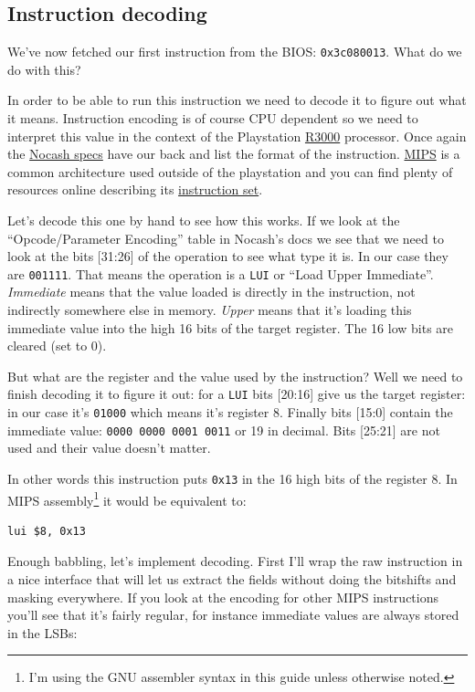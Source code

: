 \documentclass[a4paper]{article}
\newcommand{\code}[1] {\texttt{#1}}
\begin{document}
\subsection{Instruction decoding}

We've now fetched our first instruction from the BIOS:
\code{0x3c080013}. What do we do with this?

In order to be able to run this instruction we need to decode it to
figure out what it means. Instruction encoding is of course CPU
dependent so we need to interpret this value in the context of the
Playstation \href{https://en.wikipedia.org/wiki/R3000}{R3000}
processor. Once again the
\href{http://problemkaputt.de/psx-spx.htm#cpuspecifications}{Nocash
  specs} have our back and list the format of the
instruction. \href{https://en.wikipedia.org/wiki/MIPS_instruction_set}{MIPS}
is a common architecture used outside of the playstation and you can
find plenty of resources online describing its \href{https://en.wikipedia.org/wiki/Instruction_set}{instruction set}.

Let's decode this one by hand to see how this works. If we look at the
``Opcode/Parameter Encoding'' table in Nocash's docs we see that we
need to look at the bits [31:26] of the operation to see what type it
is. In our case they are \code{001111}. That means the operation is
a \code{LUI} or ``Load Upper Immediate''. \emph{Immediate} means
that the value loaded is directly in the instruction, not indirectly
somewhere else in memory. \emph{Upper} means that it's loading this
immediate value into the high 16 bits of the target register. The 16
low bits are cleared (set to 0).

But what are the register and the value used by the instruction? Well
we need to finish decoding it to figure it out: for a \code{LUI}
bits [20:16] give us the target register: in our case it's
\code{01000} which means it's register 8. Finally bits [15:0]
contain the immediate value: \code{0000 0000 0001 0011} or 19 in
decimal. Bits [25:21] are not used and their value doesn't matter.

In other words this instruction puts \code{0x13} in the 16 high bits
of the register 8. In MIPS assembly\footnote{I'm using the GNU
  assembler syntax in this guide unless otherwise noted.} it would be
equivalent to:

\begin{lstlisting}[language=assembly]
lui $8, 0x13
\end{lstlisting}

Enough babbling, let's implement decoding. First I'll wrap the raw
instruction in a nice interface that will let us extract the fields
without doing the bitshifts and masking everywhere. If you look at the
encoding for other MIPS instructions you'll see that it's fairly
regular, for instance immediate values are always stored in the LSBs:
\end{document}
